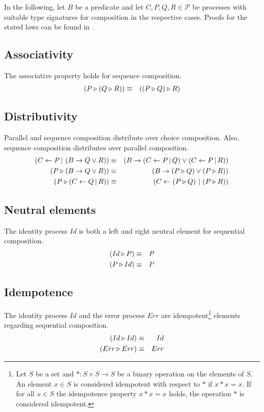 In the following, let $B$ be a predicate and let $C, P, Q, R \in \mathcal{P}$ be processes with suitable type signatures for composition in the respective cases. Proofs for the stated laws can be found in .

\subsection{Associativity}
The associative property holds for sequence composition.
\begin{eqnarray*}
  \left( P \triangleright \left( Q \triangleright R \right) \right) & \equiv & \left( \left( P \triangleright Q \right) \triangleright R \right)
\end{eqnarray*}

\subsection{Distributivity}
Parallel and sequence composition distribute over choice composition. Also, sequence composition distributes over parallel composition.
\begin{eqnarray*}
  \left( C \gets P \, | \, \left( B \to Q \vee R \right) \right) & \equiv & \left( B \to \left( C \gets P \, | \, Q \right) \vee \left( C \gets P \, | \, R \right) \right) \\
  \left( P \triangleright \left( B \to Q \vee R \right) \right) & \equiv & \left( B \to \left( P \triangleright Q \right) \vee \left( P \triangleright R \right) \right) \\
  \left( P \triangleright \left( C \gets Q \, | \, R \right) \right) & \equiv & \left( C \gets \left( P \triangleright Q \right) \, | \, \left( P \triangleright R \right) \right)
\end{eqnarray*}

\subsection{Neutral elements}
The identity process $Id$ is both a left and right neutral element for sequential composition.
\begin{eqnarray*}
  \left( Id \triangleright P \right) & \equiv & P \\
  \left( P \triangleright Id \right) & \equiv & P
\end{eqnarray*}

\subsection{Idempotence}
The identity process $Id$ and the error process $Err$ are idempotent\footnote{Let $S$ be a set and $\ast \colon S \times S \to S$ be a binary operation on the elements of $S$. An element $x \in S$ is considered idempotent with respect to $\ast$ if $x \ast x = x$. If for all $x \in S$ the idempotence property $x \ast x = x$ holds, the operation $\ast$ is considered idempotent.} elements regarding sequential composition.
\begin{eqnarray*}
  \left( Id \triangleright Id \right) & \equiv & Id \\
  \left( Err \triangleright Err \right) & \equiv & Err \\
\end{eqnarray*}